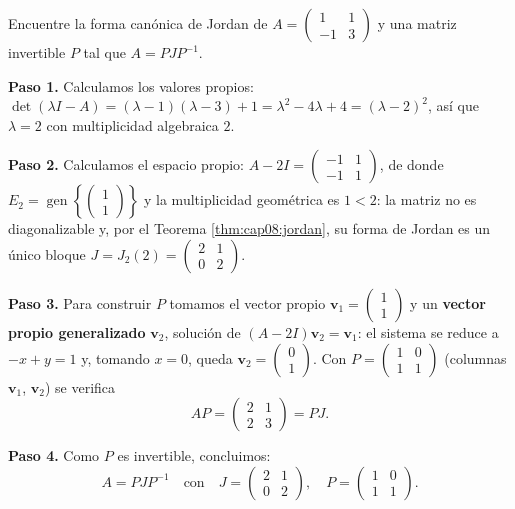 \begin{example}\label{ex:jordan_2x2}
Encuentre la forma canónica de Jordan de $A=\begin{pmatrix} 1 & 1 \\ -1 & 3 \end{pmatrix}$ y una matriz invertible $P$ tal que $A=PJP^{-1}$.
\begin{myproof}
\textbf{Paso 1.} Calculamos los valores propios: $\det(\lambda I - A) = (\lambda-1)(\lambda-3)+1 = \lambda^2-4\lambda+4 = (\lambda-2)^2$, así que $\lambda=2$ con multiplicidad algebraica $2$.

\textbf{Paso 2.} Calculamos el espacio propio: $A-2I=\begin{pmatrix} -1 & 1 \\ -1 & 1 \end{pmatrix}$, de donde $E_2=\operatorname{gen}\left\{\begin{pmatrix}1\\1\end{pmatrix}\right\}$ y la multiplicidad geométrica es $1<2$: la matriz no es diagonalizable y, por el Teorema \ref{thm:cap08:jordan}, su forma de Jordan es un único bloque $J=J_2(2)=\begin{pmatrix}2&1\\0&2\end{pmatrix}$.

\textbf{Paso 3.} Para construir $P$ tomamos el vector propio $\mathbf{v}_1=\begin{pmatrix}1\\1\end{pmatrix}$ y un \textbf{vector propio generalizado} $\mathbf{v}_2$, solución de $(A-2I)\mathbf{v}_2=\mathbf{v}_1$: el sistema se reduce a $-x+y=1$ y, tomando $x=0$, queda $\mathbf{v}_2=\begin{pmatrix}0\\1\end{pmatrix}$. Con $P=\begin{pmatrix}1&0\\1&1\end{pmatrix}$ (columnas $\mathbf{v}_1$, $\mathbf{v}_2$) se verifica
\[
AP=\begin{pmatrix}2&1\\2&3\end{pmatrix}=PJ.
\]

\textbf{Paso 4.} Como $P$ es invertible, concluimos:
\[
\boxed{A=PJP^{-1} \quad\text{con}\quad J=\begin{pmatrix}2&1\\0&2\end{pmatrix},\quad P=\begin{pmatrix}1&0\\1&1\end{pmatrix}.}
\]
\end{myproof}
\end{example}

